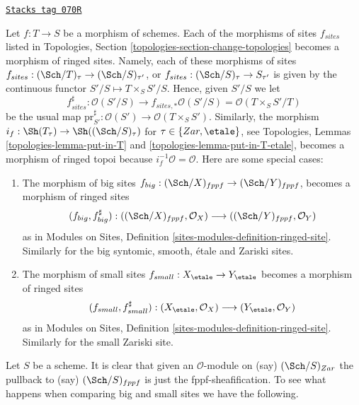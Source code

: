 \begin{remark}
\label{descent-remark-change-topologies-ringed}
\href{https://stacks.math.columbia.edu/tag/070R}{\texttt{Stacks tag 070R}}

Let $f : T \to S$ be a morphism of schemes.
Each of the morphisms of sites $f_{sites}$ listed in
Topologies, Section \ref{topologies-section-change-topologies}
becomes a morphism of ringed sites. Namely, each of these morphisms of sites
$f_{sites} : (\Sch/T)_\tau \to (\Sch/S)_{\tau'}$, or
$f_{sites} : (\Sch/S)_\tau \to S_{\tau'}$ is given by the continuous
functor $S'/S \mapsto T \times_S S'/S$. Hence, given $S'/S$ we let
$$
f_{sites}^\sharp :
\mathcal{O}(S'/S)
\longrightarrow
f_{sites, *}\mathcal{O}(S'/S) =
\mathcal{O}(T \times_S S'/T)
$$
be the usual map
$\text{pr}_{S'}^\sharp : \mathcal{O}(S') \to \mathcal{O}(T \times_S S')$.
Similarly, the morphism
$i_f : \Sh(T_\tau) \to \Sh((\Sch/S)_\tau)$
for $\tau \in \{Zar, \etale\}$, see
Topologies, Lemmas \ref{topologies-lemma-put-in-T} and
\ref{topologies-lemma-put-in-T-etale},
becomes a morphism of ringed topoi because $i_f^{-1}\mathcal{O} = \mathcal{O}$.
Here are some special cases:
\begin{enumerate}
\item The morphism of big sites
$f_{big} : (\Sch/X)_{fppf} \to (\Sch/Y)_{fppf}$,
becomes a morphism of ringed sites
$$
(f_{big}, f_{big}^\sharp) :
((\Sch/X)_{fppf}, \mathcal{O}_X)
\longrightarrow
((\Sch/Y)_{fppf}, \mathcal{O}_Y)
$$
as in Modules on Sites, Definition \ref{sites-modules-definition-ringed-site}.
Similarly for the big syntomic, smooth, \'etale and Zariski sites.
\item The morphism of small sites
$f_{small} : X_\etale \to Y_\etale$
becomes a morphism of ringed sites
$$
(f_{small}, f_{small}^\sharp) :
(X_\etale, \mathcal{O}_X)
\longrightarrow
(Y_\etale, \mathcal{O}_Y)
$$
as in Modules on Sites, Definition \ref{sites-modules-definition-ringed-site}.
Similarly for the small Zariski site.
\end{enumerate}
\end{remark}

Let $S$ be a scheme. It is clear that given an $\mathcal{O}$-module on (say)
$(\Sch/S)_{Zar}$ the pullback to (say) $(\Sch/S)_{fppf}$
is just the fppf-sheafification. To see what happens when comparing
big and small sites we have the following.

